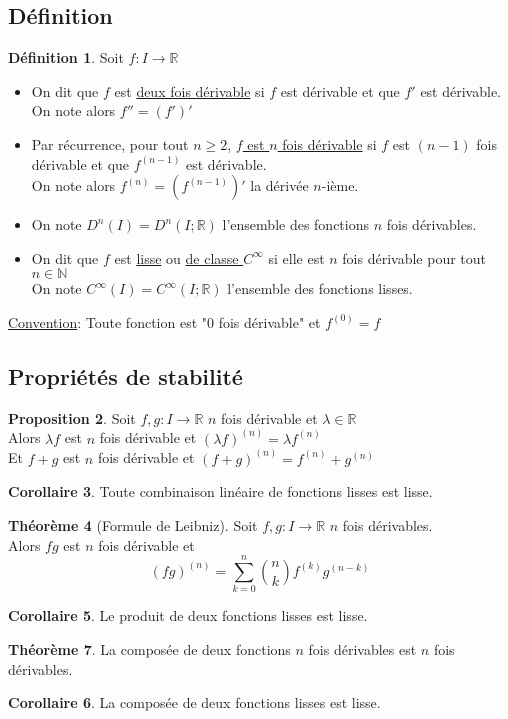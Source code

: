 \documentclass[10pt,a4paper]{article}
\theoremstyle{definition}
\newtheorem{proposition}{Proposition}[section]
\newtheorem{theorem}[proposition]{Théorème}
\newtheorem{corollaire}[proposition]{Corollaire}
\newtheorem{definition}[proposition]{Définition}
\begin{document}
\subsection{Définition}
\begin{definition}
Soit $f: I \to \mathbb{R}$
\begin{itemize}
\item On dit que $f$ est \uline{deux fois dérivable} si $f$ est dérivable et que $f'$ est dérivable. \\
On note alors $f'' = (f')'$
\item Par récurrence, pour tout $n \geq 2$, \uline{$f$ est $n$ fois dérivable} si $f$ est $(n - 1)$ fois dérivable et que $f^{(n -1)}$ est dérivable. \\
On note alors $f^{(n)} = \left( f^{(n - 1)} \right)'$ la dérivée $n$-ième.
\item On note $D^n(I) = D^n(I; \mathbb{R})$ l'ensemble des fonctions $n$ fois dérivables.
\item On dit que $f$ est \uline{lisse} ou \uline{de classe $C^\infty$} si elle est $n$ fois dérivable pour tout $n \in \mathbb{N}$ \\
On note $C^\infty(I) = C^\infty(I; \mathbb{R})$ l'ensemble des fonctions lisses.
\end{itemize} \medskip

\noindent \uline{Convention}: Toute fonction est "$0$ fois dérivable" et $f^{(0)} = f$
\end{definition}

\subsection{Propriétés de stabilité}
\begin{proposition}
Soit $f, g: I \to \mathbb{R}$ $n$ fois dérivable et $\lambda \in \mathbb{R}$ \\
Alors $\lambda f$ est $n$ fois dérivable et $(\lambda f)^{(n)} = \lambda f^{(n)}$ \\
Et $f + g$ est $n$ fois dérivable et $(f + g)^{(n)} = f^{(n)} + g^{(n)}$
\end{proposition}
\begin{corollaire}
Toute combinaison linéaire de fonctions lisses est lisse.
\end{corollaire}
\begin{theorem}[Formule de Leibniz]
Soit $f, g: I \to \mathbb{R}$ $n$ fois dérivables. \\
Alors $fg$ est $n$ fois dérivable et
\[ (fg)^{(n)} = \sum_{k = 0}^n \binom{n}{k} f^{(k)} g^{(n - k)} \]
\end{theorem}
\begin{corollaire}
Le produit de deux fonctions lisses est lisse.
\end{corollaire}
\begin{theorem}
La composée de deux fonctions $n$ fois dérivables est $n$ fois dérivables.
\begin{corollaire}
La composée de deux fonctions lisses est lisse.
\end{corollaire}
\end{theorem}
\end{document}
